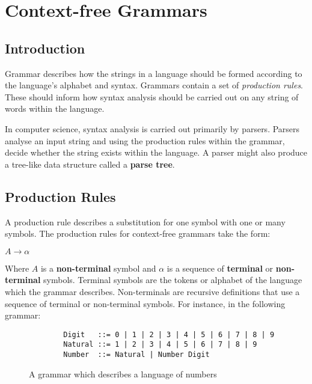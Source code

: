 \section{Context-free Grammars}

\subsection{Introduction}

Grammar describes how the strings in a language should be formed according to the language's alphabet and syntax. Grammars contain a set of \textit{production rules}. These should inform how syntax analysis should be carried out on any string of words within the language.

In computer science, syntax analysis is carried out primarily by parsers. Parsers analyse an input string and using the production rules within the grammar, decide whether the string exists within the language. A parser might also produce a tree-like data structure called a \textbf{parse tree}.

\subsection{Production Rules}

A production rule describes a substitution for one symbol with one or many symbols\textsuperscript{\cite{scott_johnstone_1998}}. The production rules for context-free grammars take the form:

\begin{center}
    $A \rightarrow \alpha$
\end{center}

Where $A$ is a \textbf{non-terminal} symbol and $\alpha$ is a sequence of \textbf{terminal} or \textbf{non-terminal} symbols. Terminal symbols are the tokens or alphabet of the language which the grammar describes. Non-terminals are recursive definitions that use a sequence of terminal or non-terminal symbols\textsuperscript{\cite{barbosa_2018}}. For instance, in the following grammar:

\begin{figure}[h]
    \begin{center}    
        \begin{verbatim}
        Digit   ::= 0 | 1 | 2 | 3 | 4 | 5 | 6 | 7 | 8 | 9
        Natural ::= 1 | 2 | 3 | 4 | 5 | 6 | 7 | 8 | 9
        Number  ::= Natural | Number Digit
        \end{verbatim}
        \vspace{-1.5em}
    \end{center}
    \caption{\label{fig:3.1}A grammar which describes a language of numbers}
\end{figure}

